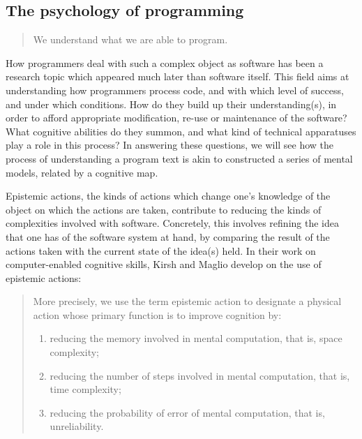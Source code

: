 \subsection{The psychology of programming}
\label{subsec:psychology-programming}

\begin{quote}
    We understand what we are able to program. \citep{ershov_aesthetics_1972}
\end{quote}

How programmers deal with such a complex object as software has been a research topic which appeared much later than software itself. This field aims at understanding how programmers process code, and with which level of success, and under which conditions. How do they build up their understanding(s), in order to afford appropriate modification, re-use or maintenance of the software? What cognitive abilities do they summon, and what kind of technical apparatuses play a role in this process? In answering these questions, we will see how the process of understanding a program text is akin to constructed a series of mental models, related by a cognitive map.

Epistemic actions, the kinds of actions which change one's knowledge of the object on which the actions are taken, contribute to reducing the kinds of complexities involved with software. Concretely, this involves refining the idea that one has of the software system at hand, by comparing the result of the actions taken with the current state of the idea(s) held. In their work on computer-enabled cognitive skills, Kirsh and Maglio develop on the use of epistemic actions:

\begin{quote}
    More precisely, we use the term epistemic action to designate a physical action whose primary function is to improve cognition by:
    \begin{enumerate}
        \item{reducing the memory involved in mental computation, that is, space complexity;}
        \item{reducing the number of steps involved in mental computation, that is, time complexity;}
        \item{reducing the probability of error of mental computation, that is, unreliability.}
    \end{enumerate}
    \citep{kirsh_distinguishing_1994}
\end{quote}

